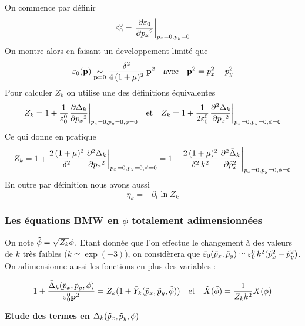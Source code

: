 \documentclass[10pt]{article}
\begin{document}
On commence par définir 
\begin{equation}
\varepsilon_0^0 ={\left. \frac{\partial \varepsilon_0}{ \partial {{p_x}^2}} \right|}_{p_x = 0, p_y = 0}
\end{equation}
On montre alors en faisant un developpement limité que
\begin{equation}
\varepsilon_0({\bf p})  \underset{{\bf p} = 0}{\sim} \frac{\delta^2}{4\,(1+\mu)^2} \, {\bf p}^2 \quad \text{avec} \quad {\bf p}^2 = p_x^2 + p_y^2
\end{equation}
Pour calculer $Z_k$ on utilise une des définitions équivalentes
\begin{equation}
Z_k = 1+\frac{1}{\varepsilon_0^0}{\left. \frac{\partial \Delta_k}{\partial {p_x}^2} \right|}_{p_x = 0, p_y = 0, \phi = 0}  \quad \text{et} \quad 
Z_k = 1+\frac{1}{2\varepsilon_0^0}{\left. \frac{\partial^2 \Delta_k}{\partial {p_x}^2} \right|}_{p_x = 0, p_y = 0, \phi = 0} 
\end{equation}
Ce qui donne en pratique
\begin{equation}
Z_k = 1+\frac{2\,(1+\mu)^2}{\delta^2}{\left. \frac{\partial^2 \Delta_k}{\partial {p_x}^2} \right|}_{p_x = 0, p_y = 0, \phi = 0} = 1+\frac{2\,(1+\mu)^2}{\delta^2\, k^2}{\left. \frac{\partial^2 \bar{\Delta}_k}{\partial {\tilde{p}_x}^2} \right|}_{p_x = 0, p_y = 0, \phi = 0}
\end{equation}
En outre par définition nous avons aussi
\begin{equation}
\eta_k = -\partial_t \ln Z_k 
\end{equation}

\vspace*{11pt}
\subsubsection{Les équations BMW en $\phi$ totalement adimensionnées}

On note $\tilde{\phi} = \sqrt{Z_k}\phi$. Etant donnée que l'on effectue le changement à des valeurs de $k$ très faibles ($k \simeq \exp(-3)$), on considèrera que $\bar{\varepsilon}_0(\tilde{p}_x,\tilde{p}_y) \simeq \varepsilon_0^0\,k^2(\tilde{p}_x^2+\tilde{p}_y^2)$. On adimensionne aussi les fonctions en plus des variables :

\begin{equation*}
1 + \frac{\bar{\Delta}_k(\tilde{p}_x, \tilde{p}_y,\phi)}{\varepsilon_0^0 {\bf p}^2} = Z_k(1+\tilde{Y}_k(\tilde{p}_x, \tilde{p}_y,\tilde{\phi})) \quad \text{et} \quad \tilde{X}(\tilde{\phi}) = \frac{1}{Z_k k^2} X(\phi)
\end{equation*}


\vspace*{11pt}
\noindent
\textbf{Etude des termes en $\bar{\Delta}_k(\tilde{p}_x, \tilde{p}_y,\phi)$} \\
\end{document}
